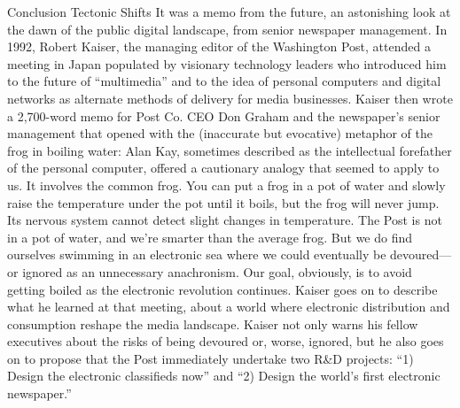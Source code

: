 Conclusion
Tectonic Shifts
It was a memo from the future, an astonishing look at the dawn of the public
digital landscape, from senior newspaper management. In 1992, Robert Kaiser,
the managing editor of the Washington Post, attended a meeting in Japan populated
by visionary technology leaders who introduced him to the future of ``multimedia''
and to the idea of personal computers and digital networks as alternate
methods of delivery for media businesses.
Kaiser then wrote a 2,700-word memo for Post Co. CEO Don Graham and the
newspaper’s senior management that opened with the (inaccurate but evocative)
metaphor of the frog in boiling water:
Alan Kay, sometimes described as the intellectual forefather of the personal
computer, offered a cautionary analogy that seemed to apply to
us. It involves the common frog. You can put a frog in a pot of water
and slowly raise the temperature under the pot until it boils, but the
frog will never jump. Its nervous system cannot detect slight changes
in temperature.
The Post is not in a pot of water, and we’re smarter than the average
frog. But we do find ourselves swimming in an electronic sea where we
could eventually be devoured—or ignored as an unnecessary anachronism.
Our goal, obviously, is to avoid getting boiled as the electronic
revolution continues.
Kaiser goes on to describe what he learned at that meeting, about a world
where electronic distribution and consumption reshape the media landscape.
Kaiser not only warns his fellow executives about the risks of being devoured
or, worse, ignored, but he also goes on to propose that the Post immediately
undertake two R&D projects: ``1) Design the electronic classifieds now'' and
``2) Design the world’s first electronic newspaper.''


